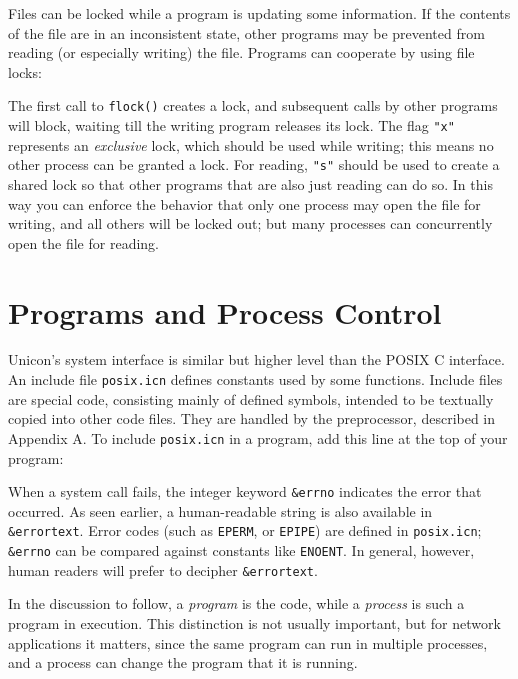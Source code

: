 Files can be locked while a program is updating some
information. If the contents of the file are in an inconsistent state, other
programs may be prevented from reading (or especially writing) the
file. Programs can cooperate by using file locks:


\noindent
The first call to \texttt{flock()} creates a lock, and subsequent
calls by other programs will block, waiting till the
writing program releases its lock. The flag
\texttt{"x"} represents an
\textit{exclusive} lock, which should be used while writing; this means
no other process can be granted a lock. For reading,
\texttt{"s"} should be used to create a
shared lock so that other programs that are also just reading can do
so. In this way you can enforce the behavior that only one process may
open the file for writing, and all others will be locked out; but many
processes can concurrently open the file for reading.

\section{Programs and Process Control}

Unicon's system interface is similar but
higher level than the POSIX C interface. An include file
\texttt{posix.icn} defines constants used by some functions. Include
files are special code, consisting mainly of defined symbols, intended
to be textually copied into other code files. They are handled by the
preprocessor, described in Appendix A. To include \texttt{posix.icn} in
a program, add this line at the top of your program:


When a system call fails, the integer keyword
\texttt{\&errno} indicates the error that occurred. As seen earlier, a
human-readable string is also available in \texttt{\&errortext}. Error codes (such as \texttt{EPERM}, or
\texttt{EPIPE}) are defined in \texttt{posix.icn}; \texttt{\&errno} can be compared against constants like
\texttt{ENOENT}. In general, however, human readers will prefer to
decipher \texttt{\&errortext}.

In the discussion to follow, a \textit{program} is the code, while
a \textit{process} is such
a program in execution. This distinction is not usually important, but
for network applications it matters,
since the same program can run in multiple processes, and a process can
change the program that it is running.

